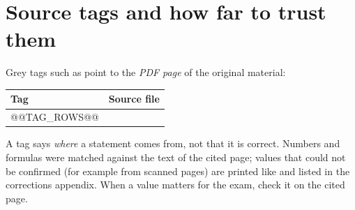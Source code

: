 \section*{Source tags and how far to trust them}
Grey tags such as  point to the \emph{PDF page} of the original material:

{\small\begin{tabularx}{\linewidth}{@{}l>{\raggedright\arraybackslash}X@{}}
\toprule
Tag & Source file\\
\midrule
@@TAG_ROWS@@
\bottomrule
\end{tabularx}}

A tag says \emph{where} a statement comes from, not that it is correct. Numbers and formulas were
matched against the text of the cited page; values that could not be confirmed (for example from
scanned pages) are printed like  and listed in the corrections appendix.
When a value matters for the exam, check it on the cited page.
